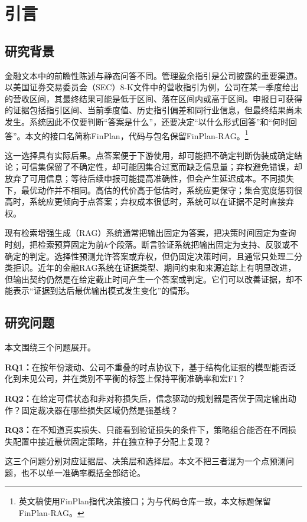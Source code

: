 \documentclass[12pt,openany]{ctexbook}
\begin{document}
\mainmatter
{}

\chapter{引言}
\label{ch:intro}

\section{研究背景}
金融文本中的前瞻性陈述与静态问答不同。管理盈余指引是公司披露的重要渠道\cite{hirst2008management}。以美国证券交易委员会（SEC）8-K文件中的营收指引为例，公司在某一季度给出的营收区间，其最终结果可能是低于区间、落在区间内或高于区间。申报日可获得的证据包括指引区间、当前季度值、历史指引偏差和同行业信息，但最终结果尚未发生。系统因此不仅要判断“答案是什么”，还要决定“以什么形式回答”和“何时回答”。本文的接口名简称FinPlan，代码与包名保留FinPlan-RAG。\footnote{英文稿使用FinPlan指代决策接口；为与代码仓库一致，本文标题保留FinPlan-RAG。}\par
这一选择具有实际后果。点答案便于下游使用，却可能把不确定判断伪装成确定结论；可信集保留了不确定性，却可能因集合过宽而缺乏信息量；弃权避免错误，却放弃了可用信息；等待后续申报可能提高准确性，但会产生延迟成本。不同损失下，最优动作并不相同。高估的代价高于低估时，系统应更保守；集合宽度惩罚很高时，系统应更倾向于点答案；弃权成本很低时，系统可以在证据不足时直接弃权。\par
现有检索增强生成（RAG）系统通常把输出固定为答案，把决策时间固定为查询时刻，把检索预算固定为前$k$个段落。断言验证系统把输出固定为支持、反驳或不确定的判定。选择性预测允许答案或弃权，但仍固定决策时间，且通常只处理二分类拒识。近年的金融RAG系统在证据类型、期间约束和来源追踪上有明显改进，但输出契约仍然是在给定截止时间产生一个答案或判定。它们可以改善证据，却不能表示“证据到达后最优输出模式发生变化”的情形。\par

\section{研究问题}
本文围绕三个问题展开。\par
\textbf{RQ1：}在按年份滚动、公司不重叠的时点协议下，基于结构化证据的模型能否泛化到未见公司，并在类别不平衡的标签上保持平衡准确率和宏F1？\par
\textbf{RQ2：}在给定可信状态和非对称损失后，信念驱动的规划器是否优于固定输出动作？固定裁决器在哪些损失区域仍然是强基线？\par
\textbf{RQ3：}在不知道真实损失、只能看到验证损失的条件下，策略组合能否在不同损失配置中接近最优固定策略，并在独立种子分配上复现？\par
这三个问题分别对应证据层、决策层和选择层。本文不把三者混为一个点预测问题，也不以单一准确率概括全部结论。\par
\end{document}
